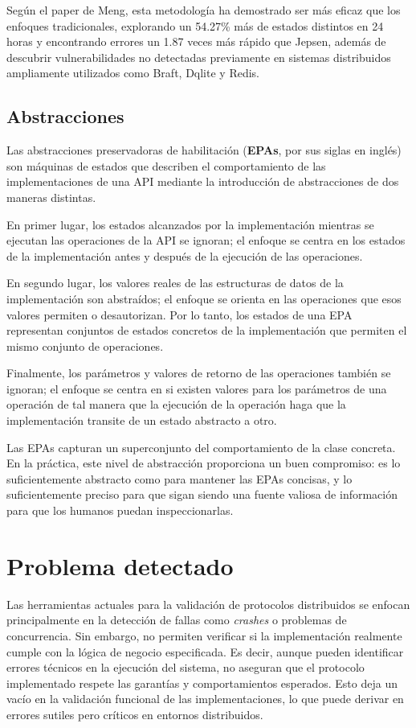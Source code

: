 \documentclass[12pt]{article}
\begin{document}
Según el paper de Meng, esta metodología ha demostrado ser más eficaz que los enfoques tradicionales, explorando un 54.27\% más de estados distintos en 24 horas y encontrando errores un 1.87 veces más rápido que Jepsen, además de descubrir vulnerabilidades no detectadas previamente en sistemas distribuidos ampliamente utilizados como Braft, Dqlite y Redis.


\subsection{Abstracciones}

Las abstracciones preservadoras de habilitación (\textbf{EPAs}, por sus siglas en inglés) son máquinas de estados que describen el comportamiento de las implementaciones de una API mediante la introducción de abstracciones de dos maneras distintas.

En primer lugar, los estados alcanzados por la implementación mientras se ejecutan las operaciones de la API se ignoran; el enfoque se centra en los estados de la implementación antes y después de la ejecución de las operaciones.

En segundo lugar, los valores reales de las estructuras de datos de la implementación son abstraídos; el enfoque se orienta en las operaciones que esos valores permiten o desautorizan. Por lo tanto, los estados de una EPA representan conjuntos de estados concretos de la implementación que permiten el mismo conjunto de operaciones.

Finalmente, los parámetros y valores de retorno de las operaciones también se ignoran; el enfoque se centra en si existen valores para los parámetros de una operación de tal manera que la ejecución de la operación haga que la implementación transite de un estado abstracto a otro.

Las EPAs capturan un superconjunto del comportamiento de la clase concreta. En la práctica, este nivel de abstracción proporciona un buen compromiso: es lo suficientemente abstracto como para mantener las EPAs concisas, y lo suficientemente preciso para que sigan siendo una fuente valiosa de información para que los humanos puedan inspeccionarlas. \cite{epas2013}

\clearpage


\section{Problema detectado}

Las herramientas actuales para la validación de protocolos distribuidos se enfocan principalmente en la detección de fallas como \textit{crashes} o problemas de concurrencia. Sin embargo, no permiten verificar si la implementación realmente cumple con la lógica de negocio especificada. Es decir, aunque pueden identificar errores técnicos en la ejecución del sistema, no aseguran que el protocolo implementado respete las garantías y comportamientos esperados. Esto deja un vacío en la validación funcional de las implementaciones, lo que puede derivar en errores sutiles pero críticos en entornos distribuidos.
\end{document}
